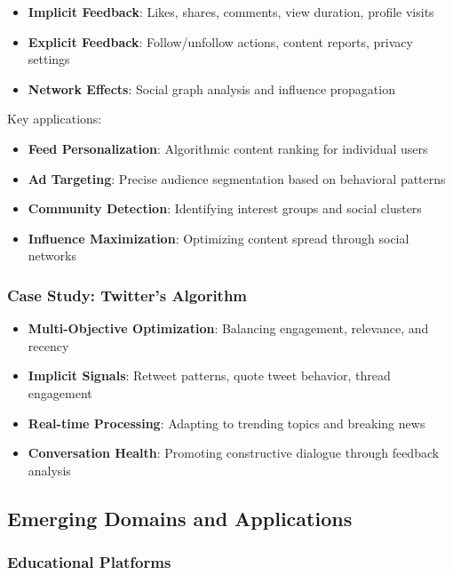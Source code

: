 \begin{itemize}
    \item \textbf{Implicit Feedback}: Likes, shares, comments, view duration, profile visits
    \item \textbf{Explicit Feedback}: Follow/unfollow actions, content reports, privacy settings
    \item \textbf{Network Effects}: Social graph analysis and influence propagation
\end{itemize}

Key applications:
\begin{itemize}
    \item \textbf{Feed Personalization}: Algorithmic content ranking for individual users
    \item \textbf{Ad Targeting}: Precise audience segmentation based on behavioral patterns
    \item \textbf{Community Detection}: Identifying interest groups and social clusters
    \item \textbf{Influence Maximization}: Optimizing content spread through social networks
\end{itemize}

\subsubsection{Case Study: Twitter's Algorithm}

\begin{itemize}
    \item \textbf{Multi-Objective Optimization}: Balancing engagement, relevance, and recency
    \item \textbf{Implicit Signals}: Retweet patterns, quote tweet behavior, thread engagement
    \item \textbf{Real-time Processing}: Adapting to trending topics and breaking news
    \item \textbf{Conversation Health}: Promoting constructive dialogue through feedback analysis
\end{itemize}

\subsection{Emerging Domains and Applications}

\subsubsection{Educational Platforms}

